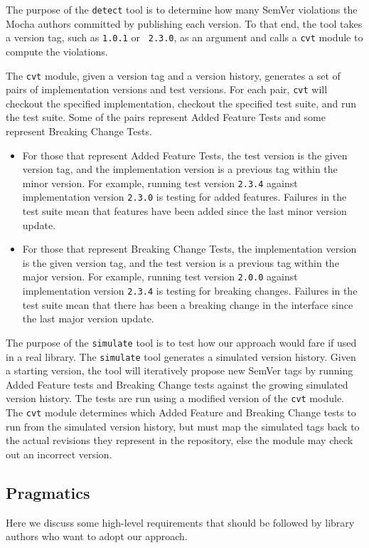 The purpose of the {\tt detect} tool is to determine how many SemVer
violations the Mocha authors committed by publishing each version. To
that end, the tool takes a version tag, such as {\tt 1.0.1} or {\tt
  2.3.0}, as an argument and calls a {\tt cvt} module to compute the
violations.

The {\tt cvt} module, given a version tag and a version history,
generates a set of pairs of implementation versions and test
versions. For each pair, {\tt cvt} will checkout the specified
implementation, checkout the specified test suite, and run the test
suite. Some of the pairs represent Added Feature Tests and some
represent Breaking Change Tests.

\begin{itemize}
\item For those that represent Added Feature Tests, the test version
  is the given version tag, and the implementation version is a
  previous tag within the minor version. For example, running test
  version {\tt 2.3.4} against implementation version {\tt 2.3.0} is
  testing for added features. Failures in the test suite mean that
  features have been added since the last minor version update.
\item For those that represent Breaking Change Tests, the
  implementation version is the given version tag, and the test
  version is a previous tag within the major version. For example,
  running test version {\tt 2.0.0} against implementation version
  {\tt 2.3.4} is testing for breaking changes. Failures in the test
  suite mean that there has been a breaking change in the interface
  since the last major version update.
\end{itemize}

The purpose of the {\tt simulate} tool is to test how our approach
would fare if used in a real library. The {\tt simulate} tool
generates a simulated version history. Given a starting version, the
tool will iteratively propose new SemVer tags by running Added
Feature tests and Breaking Change tests against the growing simulated
version history. The tests are run using a modified version of the
{\tt cvt} module. The {\tt cvt} module determines which Added Feature
and Breaking Change tests to run from the simulated version history,
but must map the simulated tags back to the actual revisions they
represent in the repository, else the module may check out an
incorrect version.

\subsection{Pragmatics}
Here we discuss some high-level requirements that should be followed
by library authors who want to adopt our approach.


